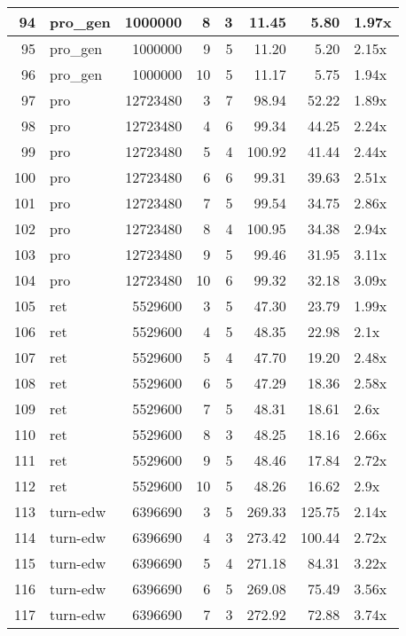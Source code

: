 \begin{table}[ht]
\begin{tabular}{rlrrrrrl}
   \hline
94 & pro\_gen & 1000000 &   8 &   3 & 11.45 & 5.80 & 1.97x \\ 
   \hline
95 & pro\_gen & 1000000 &   9 &   5 & 11.20 & 5.20 & 2.15x \\ 
   \hline
96 & pro\_gen & 1000000 &  10 &   5 & 11.17 & 5.75 & 1.94x \\ 
   \hline
97 & pro & 12723480 &   3 &   7 & 98.94 & 52.22 & 1.89x \\ 
   \hline
98 & pro & 12723480 &   4 &   6 & 99.34 & 44.25 & 2.24x \\ 
   \hline
99 & pro & 12723480 &   5 &   4 & 100.92 & 41.44 & 2.44x \\ 
   \hline
100 & pro & 12723480 &   6 &   6 & 99.31 & 39.63 & 2.51x \\ 
   \hline
101 & pro & 12723480 &   7 &   5 & 99.54 & 34.75 & 2.86x \\ 
   \hline
102 & pro & 12723480 &   8 &   4 & 100.95 & 34.38 & 2.94x \\ 
   \hline
103 & pro & 12723480 &   9 &   5 & 99.46 & 31.95 & 3.11x \\ 
   \hline
104 & pro & 12723480 &  10 &   6 & 99.32 & 32.18 & 3.09x \\ 
   \hline
105 & ret & 5529600 &   3 &   5 & 47.30 & 23.79 & 1.99x \\ 
   \hline
106 & ret & 5529600 &   4 &   5 & 48.35 & 22.98 & 2.1x \\ 
   \hline
107 & ret & 5529600 &   5 &   4 & 47.70 & 19.20 & 2.48x \\ 
   \hline
108 & ret & 5529600 &   6 &   5 & 47.29 & 18.36 & 2.58x \\ 
   \hline
109 & ret & 5529600 &   7 &   5 & 48.31 & 18.61 & 2.6x \\ 
   \hline
110 & ret & 5529600 &   8 &   3 & 48.25 & 18.16 & 2.66x \\ 
   \hline
111 & ret & 5529600 &   9 &   5 & 48.46 & 17.84 & 2.72x \\ 
   \hline
112 & ret & 5529600 &  10 &   5 & 48.26 & 16.62 & 2.9x \\ 
   \hline
113 & turn-edw & 6396690 &   3 &   5 & 269.33 & 125.75 & 2.14x \\ 
   \hline
114 & turn-edw & 6396690 &   4 &   3 & 273.42 & 100.44 & 2.72x \\ 
   \hline
115 & turn-edw & 6396690 &   5 &   4 & 271.18 & 84.31 & 3.22x \\ 
   \hline
116 & turn-edw & 6396690 &   6 &   5 & 269.08 & 75.49 & 3.56x \\ 
   \hline
117 & turn-edw & 6396690 &   7 &   3 & 272.92 & 72.88 & 3.74x \\ 

\end{tabular}
\end{table}
